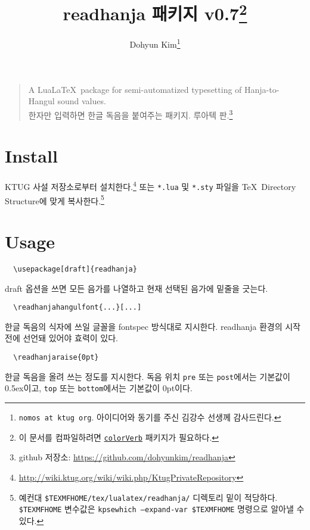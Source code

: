 \documentclass[a4paper,11pt]{article}
\begin{document}
\title{\ttfamily readhanja 패키지 v0.7\thanks{이 문서를 컴파일하려면
    \href{https://gist.github.com/dohyunkim/5f2dc71b1ff85adb3978}{\texttt{colorVerb}}
    패키지가 필요하다.
}}
\author{Dohyun Kim\thanks{\texttt{nomos at ktug org}.
  아이디어와 동기를 주신 김강수 선생께 감사드린다.}}
\maketitle

\begin{quote}
A Lua\LaTeX\ package for semi-automatized typesetting of
Hanja-to-Hangul sound values.\\
한자만 입력하면 한글 독음을 붙여주는 패키지. 루아텍 판.\footnote{
  github 저장소: \url{https://github.com/dohyunkim/readhanja}}
\end{quote}

\section*{Install}

KTUG 사설 저장소로부터 설치한다.\footnote{
  \url{http://wiki.ktug.org/wiki/wiki.php/KtugPrivateRepository}}
또는
\verb|*.lua| 및 \verb|*.sty| 파일을 \TeX\ Directory Structure에 맞게 복사한다.\footnote{
  예컨대 \texttt{\$TEXMFHOME/tex/lualatex/readhanja/} 디렉토리 밑이 적당하다.
  \texttt{\$TEXMFHOME} 변수값은 \texttt{kpsewhich --expand-var \string\$TEXMFHOME}
  명령으로 알아낼 수 있다.
}

\section*{Usage}

\begin{verbatim}
  \usepackage[draft]{readhanja}
\end{verbatim}
draft 옵션을 쓰면 모든 음가를 나열하고 현재 선택된 음가에
밑줄을 긋는다.

\begin{verbatim}
  \readhanjahangulfont{...}[...]
\end{verbatim}
한글 독음의 식자에 쓰일 글꼴을 fontspec 방식대로 지시한다.
readhanja 환경의 시작 전에 선언돼 있어야 효력이 있다.

\begin{verbatim}
  \readhanjaraise{0pt}
\end{verbatim}
한글 독음을 올려 쓰는 정도를 지시한다.
독음 위치 \verb|pre| 또는 \verb|post|에서는 기본값이 0.5ex이고,
\verb|top| 또는 \verb|bottom|에서는 기본값이 0pt이다.
\end{document}

